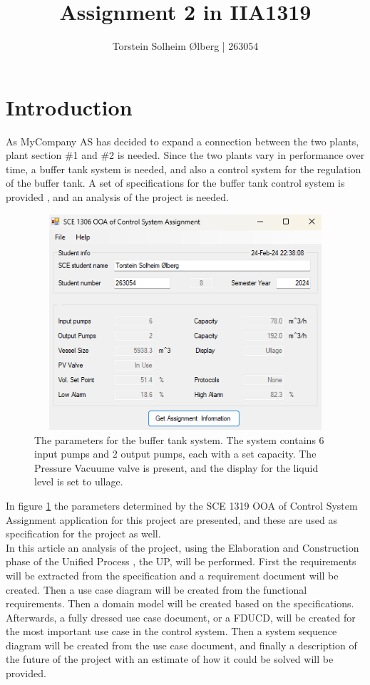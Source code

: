 \documentclass[11pt, A4paper, english]{article}
\author{Torstein Solheim Ølberg | 263054}
\title{Assignment 2 in IIA1319}
\begin{document}
\maketitle
\clearpage

\tableofcontents
\clearpage

	\section{Introduction}
As MyCompany AS has decided to expand a connection between the two plants, plant section \#1 and \#2 is needed. Since the two plants vary in performance over time, a buffer tank system is needed, and also a control system for the regulation of the buffer tank. A set of specifications for the buffer tank control system is provided \cite{task}, and an analysis of the project is needed. 
		\begin{figure}[h]
\includegraphics[width=12.6cm, height=8cm]{Assignment parameters.png}
\caption{The parameters for the buffer tank system. The system contains 6 input pumps and 2 output pumps, each with a set capacity. The Pressure Vacuume valve is present, and the display for the liquid level is set to ullage.}
\label{im:params}
		\end{figure}
In figure \ref{im:params} the parameters determined by the SCE 1319 OOA of Control System Assignment application \cite{task_params_app} for this project are presented, and these are used as specification for the project as well. \\
In this article an analysis of the project, using the Elaboration and Construction phase of the Unified Process \cite{lecture_notes}, the UP, will be performed. First the requirements will be extracted from the specification and a requirement document will be created. Then a use case diagram will be created from the functional requirements. Then a domain model will be created based on the specifications. Afterwards, a fully dressed use case document, or a FDUCD, will be created for the most important use case in the control system. Then a system sequence diagram will be created from the use case document, and finally a description of the future of the project with an estimate of how it could be solved will be provided.
\end{document}
